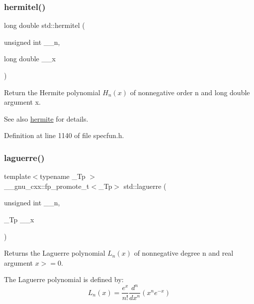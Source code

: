 \subsubsection{\texorpdfstring{hermitel()}{hermitel()}}
{\footnotesize\ttfamily long double std\+::hermitel (\begin{DoxyParamCaption}\item[{unsigned int}]{\+\_\+\+\_\+n,  }\item[{long double}]{\+\_\+\+\_\+x }\end{DoxyParamCaption})\hspace{0.3cm}{\ttfamily [inline]}}

Return the Hermite polynomial $ H_n(x) $ of nonnegative order n and {\ttfamily long double} argument {\ttfamily x}.

\begin{DoxySeeAlso}{See also}
\hyperlink{group__mathsf__std_ga8bd1626f1e3f7256c4fd13579f881183}{hermite} for details. 
\end{DoxySeeAlso}


Definition at line 1140 of file specfun.\+h.

\mbox{\label{group__mathsf__std_ga9d7b24a11dad27690387405548973ef9}} 
\subsubsection{\texorpdfstring{laguerre()}{laguerre()}}
{\footnotesize\ttfamily template$<$typename \+\_\+\+Tp $>$ \\
\+\_\+\+\_\+gnu\+\_\+cxx\+::fp\+\_\+promote\+\_\+t$<$\+\_\+\+Tp$>$ std\+::laguerre (\begin{DoxyParamCaption}\item[{unsigned int}]{\+\_\+\+\_\+n,  }\item[{\+\_\+\+Tp}]{\+\_\+\+\_\+x }\end{DoxyParamCaption})\hspace{0.3cm}{\ttfamily [inline]}}

Returns the Laguerre polynomial $ L_n(x) $ of nonnegative degree {\ttfamily n} and real argument $ x >= 0 $.

The Laguerre polynomial is defined by\+: \[ L_n(x) = \frac{e^x}{n!} \frac{d^n}{dx^n} (x^ne^{-x}) \]


